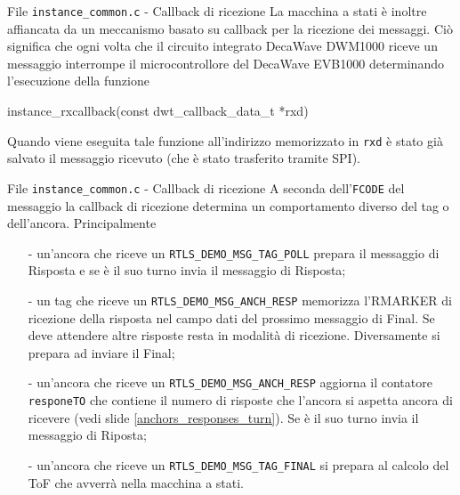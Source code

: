 \begin{frame}[fragile]{File \lstinline!instance_common.c! - Callback di ricezione}
  La macchina a stati è inoltre \alert{affiancata} da un meccanismo basato su callback per la ricezione dei messaggi.
  Ciò significa che ogni volta che il circuito integrato DecaWave DWM1000 riceve un messaggio
  interrompe il microcontrollore del DecaWave EVB1000 determinando l'esecuzione della funzione
  \begin{C}
    instance_rxcallback(const dwt_callback_data_t *rxd)
  \end{C}
  Quando viene eseguita tale funzione all'indirizzo memorizzato in \lstinline!rxd! è stato già
  salvato il messaggio ricevuto (che è stato trasferito tramite SPI).
\end{frame}

\begin{frame}[shrink=10, fragile]{File \lstinline!instance_common.c! - Callback di ricezione}
  A seconda dell'\lstinline!FCODE! del messaggio la callback di ricezione determina un comportamento diverso
  del tag o dell'ancora.
  Principalmente 
  \begin{itemize}
  \item[-]un'ancora che riceve un \lstinline!RTLS_DEMO_MSG_TAG_POLL! prepara il messaggio di Risposta e se è il suo turno
    invia il messaggio di Risposta; 
  \item[-]un tag che riceve un \lstinline!RTLS_DEMO_MSG_ANCH_RESP! memorizza l'RMARKER di ricezione della risposta nel campo dati
    del prossimo messaggio di Final. Se deve attendere altre risposte resta in modalità di ricezione. Diversamente si prepara ad inviare
    il Final;
  \item[-]un'ancora che riceve un \lstinline!RTLS_DEMO_MSG_ANCH_RESP! aggiorna il contatore \lstinline!responeTO! che contiene il numero
    di risposte che l'ancora si aspetta ancora di ricevere (vedi slide \ref{anchors_responses_turn}). Se è il suo turno invia il messaggio di Riposta;
  \item[-]un'ancora che riceve un \lstinline!RTLS_DEMO_MSG_TAG_FINAL! si prepara al calcolo del ToF che avverrà nella macchina a stati.
  \end{itemize}
\end{frame}

